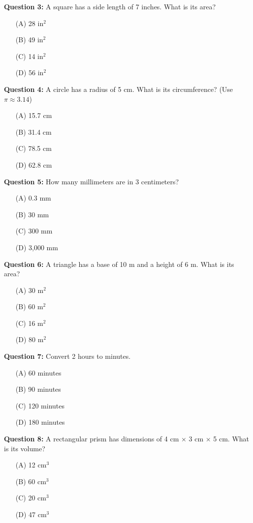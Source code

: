 \documentclass[12pt, letterpaper]{article}
\begin{document}
\noindent
\textbf{Question 3:} A square has a side length of 7 inches. What is its area?
\begin{itemize}
    \item[(A)] 28 in$^2$
    \item[(B)] 49 in$^2$
    \item[(C)] 14 in$^2$
    \item[(D)] 56 in$^2$
\end{itemize}

\noindent
\textbf{Question 4:} A circle has a radius of 5 cm. What is its circumference? (Use $\pi \approx 3.14$)
\begin{itemize}
    \item[(A)] 15.7 cm
    \item[(B)] 31.4 cm
    \item[(C)] 78.5 cm
    \item[(D)] 62.8 cm
\end{itemize}

\noindent
\textbf{Question 5:} How many millimeters are in 3 centimeters?
\begin{itemize}
    \item[(A)] 0.3 mm
    \item[(B)] 30 mm
    \item[(C)] 300 mm
    \item[(D)] 3,000 mm
\end{itemize}

\noindent
\textbf{Question 6:} A triangle has a base of 10 m and a height of 6 m. What is its area?
\begin{itemize}
    \item[(A)] 30 m$^2$
    \item[(B)] 60 m$^2$
    \item[(C)] 16 m$^2$
    \item[(D)] 80 m$^2$
\end{itemize}

\noindent
\textbf{Question 7:} Convert 2 hours to minutes.
\begin{itemize}
    \item[(A)] 60 minutes
    \item[(B)] 90 minutes
    \item[(C)] 120 minutes
    \item[(D)] 180 minutes
\end{itemize}

\noindent
\textbf{Question 8:} A rectangular prism has dimensions of 4 cm × 3 cm × 5 cm. What is its volume?
\begin{itemize}
    \item[(A)] 12 cm$^3$
    \item[(B)] 60 cm$^3$
    \item[(C)] 20 cm$^3$
    \item[(D)] 47 cm$^3$
\end{itemize}
\end{document}
